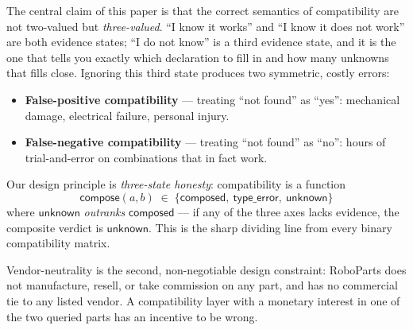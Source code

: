 \documentclass[review]{elsarticle}
\begin{document}
The central claim of this paper is that the correct semantics of
compatibility are not two-valued but \emph{three-valued}. ``I know
it works'' and ``I know it does not work'' are both evidence states;
``I do not know'' is a third evidence state, and it is the one that
tells you exactly which declaration to fill in and how many unknowns
that fills close. Ignoring this third state produces two symmetric,
costly errors:

\begin{itemize}[nosep,leftmargin=*]
\item \textbf{False-positive compatibility} — treating ``not found''
as ``yes'': mechanical damage, electrical failure, personal injury.
\item \textbf{False-negative compatibility} — treating ``not found''
as ``no'': hours of trial-and-error on combinations that in fact
work.
\end{itemize}

Our design principle is \emph{three-state honesty}: compatibility
is a function
\begin{equation}
  \mathsf{compose}(a, b) \;\in\;
  \{\mathsf{composed},\ \mathsf{type\_error},\ \mathsf{unknown}\}
  \label{eq:trivalue}
\end{equation}
where $\mathsf{unknown}$ \emph{outranks} $\mathsf{composed}$ — if
any of the three axes lacks evidence, the composite verdict is
$\mathsf{unknown}$. This is the sharp dividing line from every binary
compatibility matrix.

Vendor-neutrality is the second, non-negotiable design constraint:
RoboParts does not manufacture, resell, or take commission on any
part, and has no commercial tie to any listed vendor. A compatibility
layer with a monetary interest in one of the two queried parts has
an incentive to be wrong.
\end{document}
